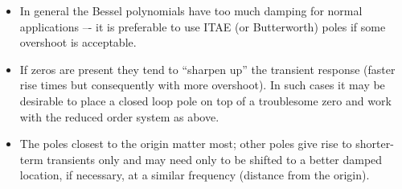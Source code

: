 \begin{itemize}
	\item In general the Bessel polynomials have too much damping for normal applications –- it is preferable to use ITAE (or Butterworth) poles if some overshoot is acceptable.
	\item If zeros are present they tend to ``sharpen up'' the transient response (faster rise times but consequently with more overshoot). In such cases it may be desirable to place a closed loop pole on top of a troublesome zero and work with the reduced order system as above.
	\item The poles closest to the origin matter most; other poles give rise to shorter-term transients only and may need only to be shifted to a better damped location, if necessary, at a similar frequency (distance from the origin).
\end{itemize}

\endinput

